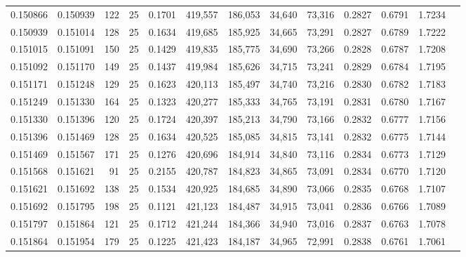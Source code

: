 \begin{tabular}{rrrrrrrrrrrrr}
0.150866 & 0.150939 &   122 &  25 &                                     0.1701 & 419,557 & 186,053 &  34,640 &  73,316 & 0.2827 & 0.6791 & 1.7234 \\
0.150939 & 0.151014 &   128 &  25 &                                     0.1634 & 419,685 & 185,925 &  34,665 &  73,291 & 0.2827 & 0.6789 & 1.7222 \\
0.151015 & 0.151091 &   150 &  25 &                                     0.1429 & 419,835 & 185,775 &  34,690 &  73,266 & 0.2828 & 0.6787 & 1.7208 \\
0.151092 & 0.151170 &   149 &  25 &                                     0.1437 & 419,984 & 185,626 &  34,715 &  73,241 & 0.2829 & 0.6784 & 1.7195 \\
0.151171 & 0.151248 &   129 &  25 &                                     0.1623 & 420,113 & 185,497 &  34,740 &  73,216 & 0.2830 & 0.6782 & 1.7183 \\
0.151249 & 0.151330 &   164 &  25 &                                     0.1323 & 420,277 & 185,333 &  34,765 &  73,191 & 0.2831 & 0.6780 & 1.7167 \\
0.151330 & 0.151396 &   120 &  25 &                                     0.1724 & 420,397 & 185,213 &  34,790 &  73,166 & 0.2832 & 0.6777 & 1.7156 \\
0.151396 & 0.151469 &   128 &  25 &                                     0.1634 & 420,525 & 185,085 &  34,815 &  73,141 & 0.2832 & 0.6775 & 1.7144 \\
0.151469 & 0.151567 &   171 &  25 &                                     0.1276 & 420,696 & 184,914 &  34,840 &  73,116 & 0.2834 & 0.6773 & 1.7129 \\
0.151568 & 0.151621 &    91 &  25 &                                     0.2155 & 420,787 & 184,823 &  34,865 &  73,091 & 0.2834 & 0.6770 & 1.7120 \\
0.151621 & 0.151692 &   138 &  25 &                                     0.1534 & 420,925 & 184,685 &  34,890 &  73,066 & 0.2835 & 0.6768 & 1.7107 \\
0.151692 & 0.151795 &   198 &  25 &                                     0.1121 & 421,123 & 184,487 &  34,915 &  73,041 & 0.2836 & 0.6766 & 1.7089 \\
0.151797 & 0.151864 &   121 &  25 &                                     0.1712 & 421,244 & 184,366 &  34,940 &  73,016 & 0.2837 & 0.6763 & 1.7078 \\
0.151864 & 0.151954 &   179 &  25 &                                     0.1225 & 421,423 & 184,187 &  34,965 &  72,991 & 0.2838 & 0.6761 & 1.7061 \\

\end{tabular}
